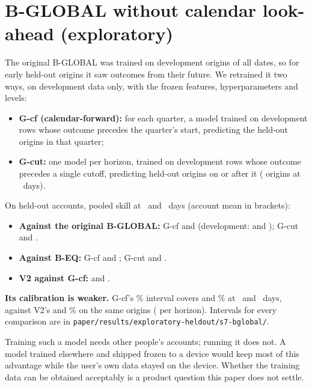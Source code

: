 \section{B-GLOBAL without calendar look-ahead (exploratory)}
\label{app:bglobal}
The original B-GLOBAL was trained on development origins of all dates, so
for early held-out origins it saw outcomes from their future. We retrained
it two ways, on development data only, with the frozen features,
hyperparameters and levels:
\begin{itemize}
\item \textbf{G-cf (calendar-forward):} for each quarter, a model trained
  on development rows whose outcome precedes the quarter's start, predicting
  the held-out origins in that quarter;
\item \textbf{G-cut:} one model per horizon, trained on development rows
  whose outcome precedes a single cutoff, predicting held-out origins on or
  after it ( origins at \hB\ days).
\end{itemize}
On held-out accounts, pooled skill at \hB\ and \hC\ days (account mean in
brackets):
\begin{itemize}
\item \textbf{Against the original B-GLOBAL:} G-cf
   and
   (development:
   and
  ); G-cut
   and
  .
\item \textbf{Against B-EQ:} G-cf
   and
  ; G-cut
   and
  .
\item \textbf{V2 against G-cf:}
   and
  .
\end{itemize}
\textbf{Its calibration is weaker.} G-cf's \lC\% interval covers
 and
\% at \hB\ and \hC\ days, against
V2's  and \% on
the same origins ( per horizon).
Intervals for every comparison are in
\texttt{paper/results/exploratory-heldout/s7-bglobal/}.

Training such a model needs other people's accounts; running it does not.
A model trained elsewhere and shipped frozen to a device would keep most
of this advantage while the user's own data stayed on the device. Whether
the training data can be obtained acceptably is a product question this
paper does not settle.
